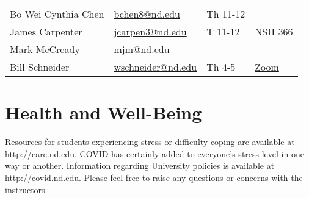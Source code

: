 \documentclass[11pt]{article}
\begin{document}
\begin{center}
\begin{tabular}{llll}
Bo Wei Cynthia Chen & \href{mailto:bchen8@nd.edu}{bchen8@nd.edu} & Th 11-12 & \\
James Carpenter & \href{mailto:jcarpen3@nd.edu}{jcarpen3@nd.edu} & T 11-12 & NSH 366\\
Mark McCready & \href{mailto:mjm@nd.edu}{mjm@nd.edu} &  & \\
Bill Schneider & \href{mailto:wschneider@nd.edu}{wschneider@nd.edu} & Th 4-5 & \href{https://www.google.com/url?q=https://notredame.zoom.us/j/94668744704?pwd\%3DbXF2Q1RuSTZOamYxc2RpZUNSM1BKUT09\&sa=D\&source=calendar\&ust=1629999731737672\&usg=AOvVaw3KPyMONj9lQaVPwtRlCPVG}{Zoom}\\
\end{tabular}
\end{center}

\section{Health and Well-Being}
\label{sec:org31224c7}
Resources for students experiencing stress or difficulty coping are available at \url{http://care.nd.edu}. COVID has certainly added to everyone's stress level in one way or another. Information regarding University policies is available at \url{http://covid.nd.edu}.  Please feel free to raise any questions or concerns with the instructors.
\end{document}
